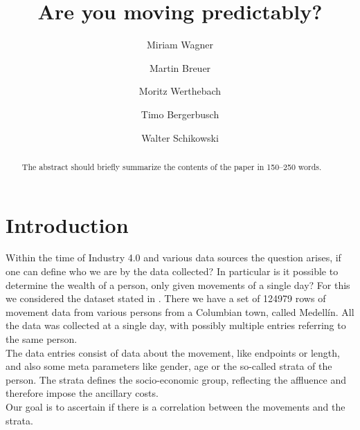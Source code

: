 \documentclass[runningheads]{llncs}
\begin{document}
	
	
	\title{Are you moving predictably?}
	\author{Miriam Wagner\and
		Martin Breuer\and
		Moritz Werthebach\and
		Timo Bergerbusch\and
		Walter Schikowski}
	\maketitle              %
	\begin{abstract} %
		The abstract should briefly summarize the contents of the paper in
		150--250 words.
		
	\end{abstract}
	\section{Introduction}
	Within the time of Industry 4.0 and various data sources the question arises, if one can define who we are by the data collected? In particular is it possible to determine the wealth of a person, only given movements of a single day?
	For this we considered the dataset stated in \cite{rich_do_not_rise_early}. There we have a set of 124979 rows of movement data from various persons from a Columbian town, called Medellín. All the data was collected at a single day, with possibly multiple entries referring to the same person.\\
	The data entries consist of data about the movement, like endpoints or length, and also some meta parameters like gender, age or the so-called strata of the person. The strata defines the socio-economic group, reflecting the affluence and therefore impose the ancillary costs.\\
	Our goal is to ascertain if there is a correlation between the movements and the strata. 
	
\end{document}
